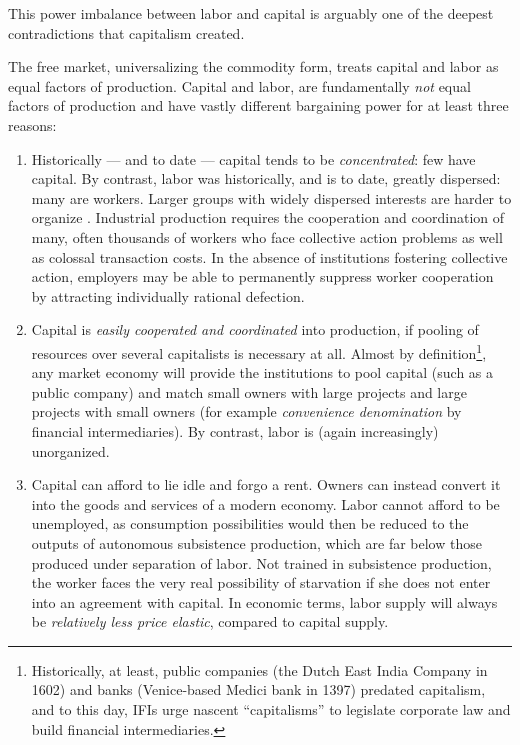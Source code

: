 This power imbalance between labor and capital is arguably one of the deepest contradictions that capitalism created. 

The free market, universalizing the commodity form, treats capital and labor as equal factors of production. Capital and labor, are fundamentally \emph{not} equal factors of production and have vastly different bargaining power for at least three reasons:

\begin{enumerate}
	\item Historically --- and to date --- capital tends to be \emph{concentrated}: few have capital. By contrast, labor was historically, and is to date, greatly dispersed: many are workers. Larger groups with widely dispersed interests are harder to organize \citep{Olson-1971-aa}. Industrial production requires the cooperation and coordination of many, often thousands of workers who face collective action problems as well as colossal transaction costs. In the absence of institutions fostering collective action, employers may be able to permanently suppress worker cooperation by attracting individually rational defection. 
	\item Capital is \emph{easily cooperated and coordinated} into production, if pooling of resources over several capitalists is necessary at all. Almost by definition\footnote{
		Historically, at least, public companies (the Dutch East India Company in 1602) and banks (Venice-based Medici bank in 1397) predated capitalism, and to this day, \glspl{IFI} urge nascent ``capitalisms'' to legislate corporate law and build financial intermediaries.}, %
	any market economy will provide the institutions to pool capital (such as a public company) and match small owners with large projects and large projects with small owners (for example  \emph{convenience denomination} by financial intermediaries). By contrast, labor is (again increasingly) unorganized.
	\item Capital can afford to lie idle and forgo a rent. Owners can instead convert it into the goods and services of a modern economy. Labor cannot afford to be unemployed, as consumption possibilities would then be reduced to the outputs of autonomous subsistence production, which are far below those produced under separation of labor. Not trained in subsistence production, the worker faces the very real possibility of starvation if she does not enter into an agreement with capital. In economic terms, labor supply will always be \emph{relatively less price elastic}, compared to capital supply. 
\end{enumerate}

